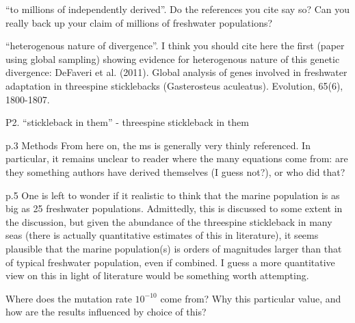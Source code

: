 \reply{
}

\begin{point}{\revref}
``to millions of independently derived''. Do the references you cite say so? Can you really back up your claim of millions of freshwater populations?
\end{point}

\reply{
}

\begin{point}{\revref}
``heterogenous nature of divergence''. I think you should cite here the first (paper using global sampling) showing evidence for heterogenous nature of this genetic divergence: DeFaveri et al. (2011). Global analysis of genes involved in freshwater adaptation in threespine sticklebacks (Gasterosteus aculeatus). Evolution, 65(6), 1800-1807.
\end{point}

\reply{
}

\begin{point}{\revref}
P2. ``stickleback in them'' - threespine stickleback in them
\end{point}

\reply{
}

\begin{point}{p.3 Methods}
From here on, the ms is generally very thinly referenced. In particular, it remains unclear to reader where the many equations come from: are they something authors have derived themselves (I guess not?), or who did that?
\end{point}

\reply{
}

\begin{point}{p.5}
One is left to wonder if it realistic to think that the marine population is as big as 25 freshwater populations. Admittedly, this is discussed to some extent in the discussion, but given the abundance of the threespine stickleback in many seas (there is actually quantitative estimates of this in literature), it seems plausible that the marine population(s) is orders of magnitudes larger than that of typical freshwater population, even if combined. I guess a more quantitative view on this in light of literature would be something worth attempting.
\end{point}

\reply{
}

\begin{point}{\revref}
    Where does the mutation rate $10^{-10}$ come from? Why this particular value, and how are the results influenced by choice of this?
\end{point}

